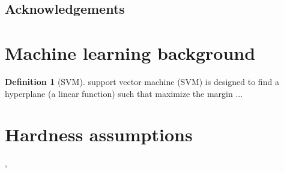\documentclass[
10pt,
aps,
pra,
linenumbers,
floatfix,
]{revtex4-2}
\theoremstyle{plain}
\theoremstyle{definition}
\newtheorem{definition}{Definition}
\begin{document}
\subsection*{Acknowledgements}



%


\onecolumngrid
\appendix

\section{Machine learning background}
\begin{definition}[SVM]\label{def:svm}
	support vector machine (SVM) is designed to
	find a hyperplane (a linear function) such that maximize the margin ...
\end{definition}
\section{Hardness assumptions}
\BQP,\BPP

\end{document}
